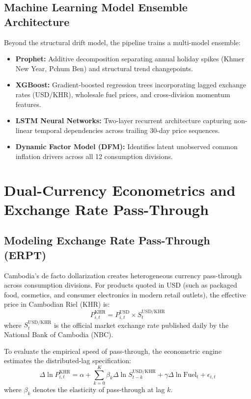 \documentclass[11pt,a4paper,oneside]{article}
\begin{document}
\subsection{Machine Learning Model Ensemble Architecture}
Beyond the structural drift model, the pipeline trains a multi-model ensemble:
\begin{itemize}[noitemsep]
    \item \textbf{Prophet:} Additive decomposition separating annual holiday spikes (Khmer New Year, Pchum Ben) and structural trend changepoints.
    \item \textbf{XGBoost:} Gradient-boosted regression trees incorporating lagged exchange rates (USD/KHR), wholesale fuel prices, and cross-division momentum features.
    \item \textbf{LSTM Neural Networks:} Two-layer recurrent architecture capturing non-linear temporal dependencies across trailing 30-day price sequences.
    \item \textbf{Dynamic Factor Model (DFM):} Identifies latent unobserved common inflation drivers across all 12 consumption divisions.
\end{itemize}

\newpage

\section{Dual-Currency Econometrics and Exchange Rate Pass-Through}

\subsection{Modeling Exchange Rate Pass-Through (ERPT)}
Cambodia's de facto dollarization creates heterogeneous currency pass-through across consumption divisions. For products quoted in USD (such as packaged food, cosmetics, and consumer electronics in modern retail outlets), the effective price in Cambodian Riel (KHR) is:
\begin{equation}
P_{i, t}^{\text{KHR}} = P_{i, t}^{\text{USD}} \times S_t^{\text{USD/KHR}}
\end{equation}
where $S_t^{\text{USD/KHR}}$ is the official market exchange rate published daily by the National Bank of Cambodia (NBC).

To evaluate the empirical speed of pass-through, the econometric engine estimates the distributed-lag specification:
\begin{equation}
\Delta \ln P_{i, t}^{\text{KHR}} = \alpha + \sum_{k=0}^K \beta_k \Delta \ln S_{t-k}^{\text{USD/KHR}} + \gamma \Delta \ln \text{Fuel}_t + \epsilon_{i, t}
\end{equation}
where $\beta_k$ denotes the elasticity of pass-through at lag $k$.
\end{document}
